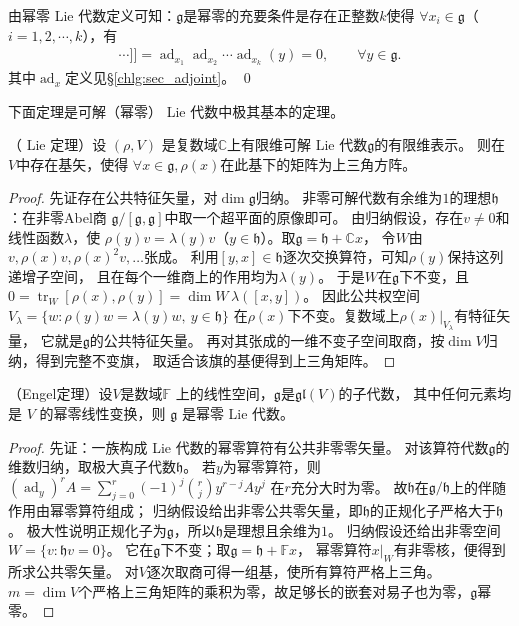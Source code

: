 \begin{example}
    由幂零 Lie 代数定义可知：$\mathfrak{g}$是幂零的充要条件是存在正整数$k$使得
    $\forall x_i\in \mathfrak{g}$（$i=1,2,\cdots,k$），有
    \begin{align*}
        [x_1,[x_2,\cdots, [{x_k},y]\cdots ]]
        =\operatorname{ad}_{x_1} \operatorname{ad}_{x_2}\cdots \operatorname{ad}_{x_k} (y) =0 ,
        \qquad \forall y\in \mathfrak{g} .
    \end{align*}
    其中$\operatorname{ad}_{x}$定义见\S \ref{chlg:sec_adjoint}。 \qed
\end{example}

下面定理是可解（幂零） Lie 代数中极其基本的定理。

\begin{theorem}
    （ Lie 定理）设 $(\rho, V)$ 是复数域$\mathbb{C}$上有限维可解 Lie 代数$\mathfrak{g}$的有限维表示。
    则在$V$中存在基矢，使得 $\forall x \in \mathfrak{g}, \rho(x)$在此基下的矩阵为上三角方阵。
\end{theorem}
\begin{proof}
先证存在公共特征矢量，对$\dim\mathfrak g$归纳。
非零可解代数有余维为$1$的理想$\mathfrak h$：在非零Abel商
$\mathfrak g/[\mathfrak g,\mathfrak g]$中取一个超平面的原像即可。
由归纳假设，存在$v\neq0$和线性函数$\lambda$，使
$\rho(y)v=\lambda(y)v$（$y\in\mathfrak h$）。取$\mathfrak g=\mathfrak h+\mathbb Cx$，
令$W$由$v,\rho(x)v,\rho(x)^2v,\ldots$张成。
利用$[y,x]\in\mathfrak h$逐次交换算符，可知$\rho(y)$保持这列递增子空间，
且在每个一维商上的作用均为$\lambda(y)$。
于是$W$在$\mathfrak g$下不变，且
$0=\operatorname{tr}_W[\rho(x),\rho(y)]=\dim W\,\lambda([x,y])$。
因此公共权空间
$V_\lambda=\{w:\rho(y)w=\lambda(y)w,\ y\in\mathfrak h\}$
在$\rho(x)$下不变。复数域上$\rho(x)|_{V_\lambda}$有特征矢量，
它就是$\mathfrak g$的公共特征矢量。
再对其张成的一维不变子空间取商，按$\dim V$归纳，得到完整不变旗，
取适合该旗的基便得到上三角矩阵。
\end{proof}

\begin{theorem}
    （Engel定理）设$V$是数域$\mathbb{F}$ 上的线性空间，$\mathfrak{g}$是$\mathfrak{gl}(V)$的子代数，
    其中任何元素均是 $V$ 的幂零线性变换，则 $\mathfrak{g}$ 是幂零 Lie 代数。
\end{theorem}
\begin{proof}
先证：一族构成 Lie 代数的幂零算符有公共非零零矢量。
对该算符代数$\mathfrak g$的维数归纳，取极大真子代数$\mathfrak h$。
若$y$为幂零算符，则
$(\operatorname{ad}_y)^r A=\sum_{j=0}^r(-1)^j\binom rj y^{r-j}Ay^j$
在$r$充分大时为零。
故$\mathfrak h$在$\mathfrak g/\mathfrak h$上的伴随作用由幂零算符组成；
归纳假设给出非零公共零矢量，即$\mathfrak h$的正规化子严格大于$\mathfrak h$。
极大性说明正规化子为$\mathfrak g$，所以$\mathfrak h$是理想且余维为$1$。
归纳假设还给出非零空间$W=\{v:\mathfrak h v=0\}$。
它在$\mathfrak g$下不变；取$\mathfrak g=\mathfrak h+\mathbb F x$，
幂零算符$x|_W$有非零核，便得到所求公共零矢量。
对$V$逐次取商可得一组基，使所有算符严格上三角。
$m=\dim V$个严格上三角矩阵的乘积为零，故足够长的嵌套对易子也为零，$\mathfrak g$幂零。
\end{proof}

